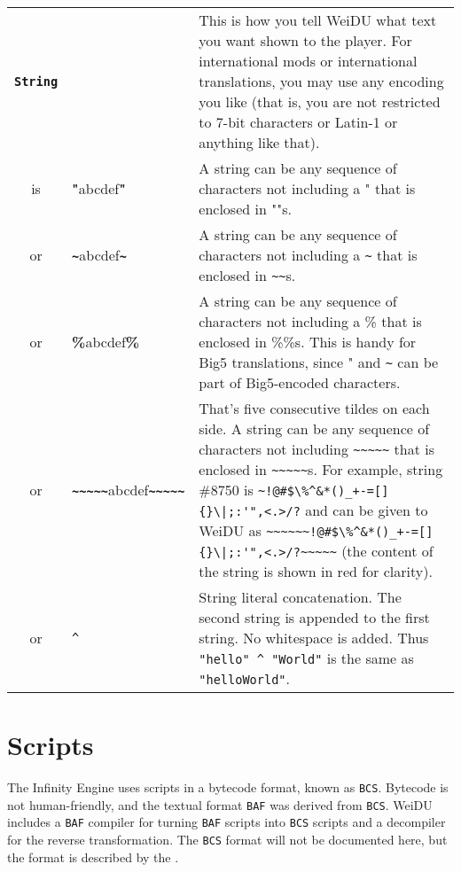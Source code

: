 \documentclass{article}
\def\ttref#1{\ahrefloc{#1}{\tt #1}}
\def\DEFINE#1{{\tt \bf #1}\label{#1}\index{#1}}
\def\t#1{{\tt #1}}
\begin{document}
\begin{tabular}{cp{10in}|p{10in}}
\DEFINE{String} & & This is how you tell WeiDU what text you want shown
to the player. For international mods or international translations, you
may use any encoding you like (that is, you are not restricted to 7-bit
characters or Latin-1 or anything like that). \\
is & {\bf{"}}abcdef{\bf{"}} & A string can be any sequence of characters not
including a " that is enclosed in ""s. \\
or & {\bf{\verb+~+}}abcdef{\bf\verb+~+} & A string can be any sequence of
characters not including a \verb+~+ that is enclosed in
{\verb+~+\verb+~+}s. \\
or & {\bf{\%}}abcdef{\bf{\%}} & A string can be any sequence of characters not
including a \% that is enclosed in \%\%s. This is handy for Big5
translations, since " and \verb+~+ can be part of Big5-encoded characters.
\\
or & {\bf{\verb+~~~~~+}}abcdef{\bf\verb+~~~~~+} & That's five consecutive
tildes on each side. A string can be any
sequence of characters not including \verb+~~~~~+ that is enclosed in
{\verb+~~~~~+}s. For example,
string \#8750 is
{\color{red}\verb`~!@#$\%^&*()_+-=[]{}\|;:'",<.>/?`}
and can be given to WeiDU as
{\verb+~~~~~+}{\color{red}\verb`~!@#$\%^&*()_+-=[]{}\|;:'",<.>/?`}{\verb+~~~~~+}
 (the content of the string is shown in red for clarity).
\\
or & \ttref{String} \t{\^{ }} \ttref{String} & String literal concatenation.
The second string is appended to the first string. No whitespace is added.
Thus \t{"hello" \^{ } "World"} is the same as \t{"helloWorld"}.

\\

\end{tabular}

\section{Scripts}

The Infinity Engine uses scripts in a bytecode format, known as
\t{BCS}. Bytecode is not human-friendly, and the textual format
\t{BAF} was derived from \t{BCS}. WeiDU includes a \t{BAF} compiler
for turning \t{BAF} scripts into \t{BCS} scripts and a decompiler for
the reverse transformation. The \t{BCS} format will not be documented
here, but the format is described by the
.
\end{document}
